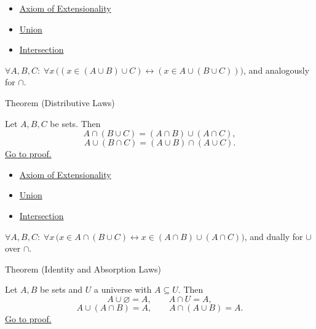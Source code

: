 \begin{dependencies}
\begin{itemize}
  \item \hyperref[ax:extensionality]{Axiom of Extensionality}
  \item \hyperref[def:union]{Union}
  \item \hyperref[def:intersection]{Intersection}
\end{itemize}
\end{dependencies}

\begin{remark*}
$\forall A, B, C:\; \forall x\,\bigl((x \in (A \cup B) \cup C) \leftrightarrow (x \in A \cup (B \cup C))\bigr)$, and analogously for $\cap$.
\end{remark*}

\begin{theorembox}{Theorem (Distributive Laws)}
\begin{theorem}\label{thm:distributivity}
Let $A,B,C$ be sets. Then
\[
A \cap (B \cup C) = (A \cap B) \cup (A \cap C),
\]
\[
A \cup (B \cap C) = (A \cup B) \cap (A \cup C).
\]
\hyperref[prf:distributivity]{Go to proof.}
\end{theorem}
\end{theorembox}

\begin{dependencies}
\begin{itemize}
  \item \hyperref[ax:extensionality]{Axiom of Extensionality}
  \item \hyperref[def:union]{Union}
  \item \hyperref[def:intersection]{Intersection}
\end{itemize}
\end{dependencies}

\begin{remark*}
$\forall A, B, C:\; \forall x\,\bigl(x \in A \cap (B \cup C) \leftrightarrow x \in (A \cap B) \cup (A \cap C)\bigr)$, and dually for $\cup$ over $\cap$.
\end{remark*}

\begin{theorembox}{Theorem (Identity and Absorption Laws)}
\begin{theorem}\label{thm:identity-absorption}
Let $A,B$ be sets and $U$ a universe with $A \subseteq U$. Then
\[
A \cup \varnothing = A,
\qquad
A \cap U = A,
\]
\[
A \cup (A \cap B) = A,
\qquad
A \cap (A \cup B) = A.
\]
\hyperref[prf:identity-absorption]{Go to proof.}
\end{theorem}
\end{theorembox}

